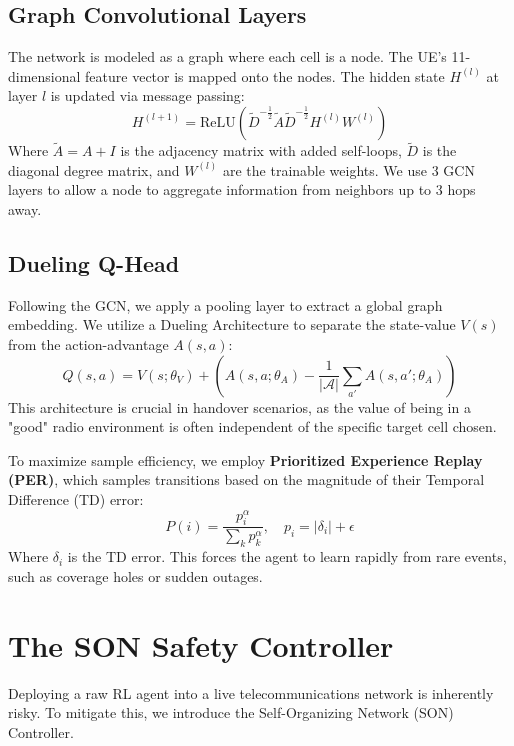 \documentclass[12pt,a4paper,oneside]{report}
\begin{document}
\subsection{Graph Convolutional Layers}
The network is modeled as a graph where each cell is a node. The UE's 11-dimensional feature vector is mapped onto the nodes. The hidden state $H^{(l)}$ at layer $l$ is updated via message passing:
\begin{equation}
    H^{(l+1)} = \text{ReLU} \left( \tilde{D}^{-\frac{1}{2}} \tilde{A} \tilde{D}^{-\frac{1}{2}} H^{(l)} W^{(l)} \right)
\end{equation}
Where $\tilde{A} = A + I$ is the adjacency matrix with added self-loops, $\tilde{D}$ is the diagonal degree matrix, and $W^{(l)}$ are the trainable weights. We use 3 GCN layers to allow a node to aggregate information from neighbors up to 3 hops away.

\subsection{Dueling Q-Head}
Following the GCN, we apply a pooling layer to extract a global graph embedding. We utilize a Dueling Architecture to separate the state-value $V(s)$ from the action-advantage $A(s,a)$:
\begin{equation}
    Q(s, a) = V(s; \theta_V) + \left( A(s, a; \theta_A) - \frac{1}{|\mathcal{A}|} \sum_{a'} A(s, a'; \theta_A) \right)
\end{equation}
This architecture is crucial in handover scenarios, as the value of being in a "good" radio environment is often independent of the specific target cell chosen.

To maximize sample efficiency, we employ \textbf{Prioritized Experience Replay (PER)}, which samples transitions based on the magnitude of their Temporal Difference (TD) error:
\begin{equation}
    P(i) = \frac{p_i^\alpha}{\sum_k p_k^\alpha}, \quad p_i = | \delta_i | + \epsilon
\end{equation}
Where $\delta_i$ is the TD error. This forces the agent to learn rapidly from rare events, such as coverage holes or sudden outages.

\section{The SON Safety Controller}
Deploying a raw RL agent into a live telecommunications network is inherently risky. To mitigate this, we introduce the Self-Organizing Network (SON) Controller. 
\end{document}
